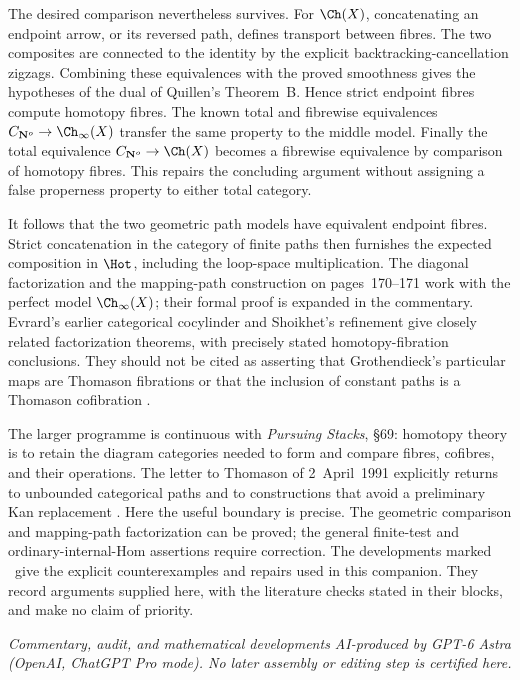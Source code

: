 The desired comparison nevertheless survives.  For $\Ch(X)$, concatenating an
endpoint arrow, or its reversed path, defines transport between fibres.
The two composites are connected to the identity by the explicit
backtracking-cancellation zigzags.  Combining these equivalences with the
proved smoothness gives the hypotheses of the dual of Quillen's Theorem~B.
Hence strict endpoint fibres compute homotopy fibres.  The known total and
fibrewise equivalences
$C_{\mathbf N^o}\to\Ch_\infty(X)$ transfer the same property to the middle
model.  Finally the total equivalence
$C_{\mathbf N^o}\to\Ch(X)$ becomes a fibrewise equivalence by comparison of
homotopy fibres.  This repairs the concluding argument without assigning a
false properness property to either total category.

It follows that the two geometric path models have equivalent endpoint
fibres.  Strict concatenation in the category of finite paths then furnishes
the expected composition in $\Hot$, including the loop-space multiplication.
The diagonal factorization and the mapping-path construction on pages~170--171
work with the perfect model $\Ch_\infty(X)$; their formal proof is expanded in
the commentary.  Evrard's earlier categorical cocylinder and Shoikhet's
refinement give closely related factorization theorems, with precisely stated
homotopy-fibration conclusions.  They should not be cited as asserting that
Grothendieck's particular maps are Thomason fibrations or that the inclusion
of constant paths is a Thomason cofibration \citep{Evrard1975,Shoikhet2016}.

The larger programme is continuous with \emph{Pursuing Stacks}, \S69: homotopy
theory is to retain the diagram categories needed to form and compare fibres,
cofibres, and their operations.  The letter to Thomason of 2~April~1991
explicitly returns to unbounded categorical paths and to constructions that
avoid a preliminary Kan replacement
\citep{Grothendieck1983,Grothendieck1991Letter}.  Here the useful boundary is
precise.  The geometric comparison and mapping-path factorization can be
proved; the general finite-test and ordinary-internal-Hom assertions require
correction.  The developments marked \ours\ give the explicit counterexamples
and repairs used in this companion.  They record arguments supplied here,
with the literature checks stated in their blocks, and make no claim of
priority.

\medskip\noindent\textit{Commentary, audit, and mathematical developments
AI-produced by GPT-6 Astra (OpenAI, ChatGPT Pro mode).  No later assembly or
editing step is certified here.}

\endgroup

